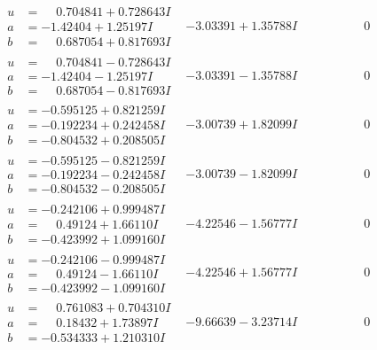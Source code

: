 \documentclass[1p]{elsarticle_modified}
\theoremstyle{definition}
\begin{document}
$$\begin{array}{c|c|c}
\begin{aligned}
u &= \phantom{-}0.704841 + 0.728643 I \\
a &= -1.42404 + 1.25197 I \\
b &= \phantom{-}0.687054 + 0.817693 I\end{aligned}
 & -3.03391 + 1.35788 I & \phantom{-0.000000 } 0 \\ \hline\begin{aligned}
u &= \phantom{-}0.704841 - 0.728643 I \\
a &= -1.42404 - 1.25197 I \\
b &= \phantom{-}0.687054 - 0.817693 I\end{aligned}
 & -3.03391 - 1.35788 I & \phantom{-0.000000 } 0 \\ \hline\begin{aligned}
u &= -0.595125 + 0.821259 I \\
a &= -0.192234 + 0.242458 I \\
b &= -0.804532 + 0.208505 I\end{aligned}
 & -3.00739 + 1.82099 I & \phantom{-0.000000 } 0 \\ \hline\begin{aligned}
u &= -0.595125 - 0.821259 I \\
a &= -0.192234 - 0.242458 I \\
b &= -0.804532 - 0.208505 I\end{aligned}
 & -3.00739 - 1.82099 I & \phantom{-0.000000 } 0 \\ \hline\begin{aligned}
u &= -0.242106 + 0.999487 I \\
a &= \phantom{-}0.49124 + 1.66110 I \\
b &= -0.423992 + 1.099160 I\end{aligned}
 & -4.22546 - 1.56777 I & \phantom{-0.000000 } 0 \\ \hline\begin{aligned}
u &= -0.242106 - 0.999487 I \\
a &= \phantom{-}0.49124 - 1.66110 I \\
b &= -0.423992 - 1.099160 I\end{aligned}
 & -4.22546 + 1.56777 I & \phantom{-0.000000 } 0 \\ \hline\begin{aligned}
u &= \phantom{-}0.761083 + 0.704310 I \\
a &= \phantom{-}0.18432 + 1.73897 I \\
b &= -0.534333 + 1.210310 I\end{aligned}
 & -9.66639 - 3.23714 I & \phantom{-0.000000 } 0 \\ \hline\begin{aligned}

\end{aligned}
\end{array}$$
\end{document}
